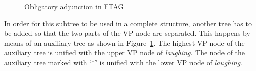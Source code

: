 \begin{figure}
\caption{\label{Obl-Adjunktion-FTAG}Obligatory adjunction in FTAG}
\end{figure}%
In order for this subtree to be used in a complete structure, another tree has to be added so that
the two parts of the VP node are separated. This happens
by means of an auxiliary tree as shown in Figure~\ref{Obl-Adjunktion-FTAG}. The highest VP node of the auxiliary tree is unified with the upper
VP node of \emph{laughing}. The node of the auxiliary tree marked with `*' is unified with the lower VP node of \emph{laughing}.
